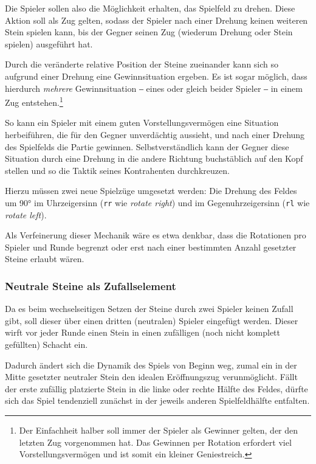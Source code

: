 \documentclass[a4paper,11pt,hidelinks]{scrartcl}
\begin{document}
Die Spieler sollen also die Möglichkeit erhalten, das Spielfeld zu drehen. Diese Aktion soll als Zug gelten, sodass der Spieler nach einer Drehung keinen weiteren Stein spielen kann, bis der Gegner seinen Zug (wiederum Drehung oder Stein spielen) ausgeführt hat.

Durch die veränderte relative Position der Steine zueinander kann sich so aufgrund einer Drehung eine Gewinnsituation ergeben. Es ist sogar möglich, dass hierdurch \textit{mehrere} Gewinnsituation ‒ eines oder gleich beider Spieler ‒ in einem Zug entstehen.\footnote{Der Einfachheit halber soll immer der Spieler als Gewinner gelten, der den letzten Zug vorgenommen hat. Das Gewinnen per Rotation erfordert viel Vorstellungsvermögen und ist somit ein kleiner Geniestreich.}

So kann ein Spieler mit einem guten Vorstellungsvermögen eine Situation herbeiführen, die für den Gegner unverdächtig aussieht, und nach einer Drehung des Spielfelds die Partie gewinnen. Selbstverständlich kann der Gegner diese Situation durch eine Drehung in die andere Richtung buchstäblich auf den Kopf stellen und so die Taktik seines Kontrahenten durchkreuzen.

Hierzu müssen zwei neue Spielzüge umgesetzt werden: Die Drehung des Feldes um 90° im Uhrzeigersinn (\texttt{rr} wie \textit{rotate right}) und im Gegenuhrzeigersinn (\texttt{rl} wie \textit{rotate left}).

Als Verfeinerung dieser Mechanik wäre es etwa denkbar, dass die Rotationen pro Spieler und Runde begrenzt oder erst nach einer bestimmten Anzahl gesetzter Steine erlaubt wären.

\subsubsection{Neutrale Steine als Zufallselement}

Da es beim wechselseitigen Setzen der Steine durch zwei Spieler keinen Zufall gibt, soll dieser über einen dritten (neutralen) Spieler eingefügt werden. Dieser wirft vor jeder Runde einen Stein in einen zufälligen (noch nicht komplett gefüllten) Schacht ein.

Dadurch ändert sich die Dynamik des Spiels von Beginn weg, zumal ein in der Mitte gesetzter neutraler Stein den idealen Eröffnungszug verunmöglicht. Fällt der erste zufällig platzierte Stein in die linke oder rechte Hälfte des Feldes, dürfte sich das Spiel tendenziell zunächst in der jeweils anderen Spielfeldhälfte entfalten.
\end{document}
